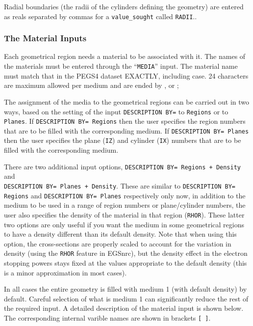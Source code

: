 \documentclass[12pt,twoside]{article}  %
\begin{document}
Radial boundaries (the radii of the cylinders defining the geometry)
are entered as reals separated by commas for a {\tt value\_sought} called
{\tt RADII}..

\subsubsection{The Material Inputs}

Each geometrical region needs a material to be associated with it.
The names of the materials must be entered through the ``\verb+MEDIA+''
input. The material name must match that in the PEGS4 dataset EXACTLY,
including case. 24 characters are maximum allowed per medium and
are ended by , or ;

The assignment of the media to the geometrical
regions can be carried out in two ways, based on the setting
of the input \verb+DESCRIPTION BY=+ to \verb+Regions+ or to
\verb+Planes+.  If {\tt DESCRIPTION BY= Regions} then the user
specifies the region numbers that are to
be filled with the corresponding medium.  If
{\tt DESCRIPTION BY= Planes} then the user specifies the
plane ({\tt IZ}) and cylinder ({\tt IX}) numbers that are
to be filled with the corresponding medium.

There are two additional input options, {\tt DESCRIPTION BY= Regions + Density}
and\\
 {\tt DESCRIPTION BY= Planes + Density}.  These are similar to
{\tt DESCRIPTION BY= Regions} and {\tt DESCRIPTION BY= Planes} respectively
only now, in addition to the medium to be used in a range of region numbers
or plane/cylinder numbers, the user also specifies the
density of the material in that region ({\tt RHOR}).
These latter two options are only useful if
you want the medium in some geometrical regions to have a density different
than its default density.  Note that when using this option, the
cross-sections are properly scaled to account for the variation in density
(using the {\tt RHOR} feature in EGSnrc), but the density effect in the
electron stopping powers stays fixed at the values appropriate to the
default density (this is a minor approximation in most cases).

In all cases the entire geometry is filled with medium 1 (with default
density) by
 default.  Careful selection of what is medium 1 can significantly reduce
the rest of the required input.  A detailed description of the material
input is shown below. The corresponding internal varible
names are shown in brackets \verb+[ ]+.
\end{document}
